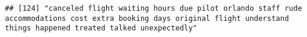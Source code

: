 \documentclass[
]{article}
\begin{document}
\begin{verbatim}
## [124] "canceled flight waiting hours due pilot orlando staff rude accommodations cost extra booking days original flight understand things happened treated talked unexpectedly"                                                                                                                                                                                                                                                                                                                                                                                                                                                                                                                                                                                                                                                                                                                                                                                                                                                                                                                                                                                                                                                                                                                                                                                                                                                                                                                                                                                                                                                                                                                                                                                                                      

\end{verbatim}
\end{document}
